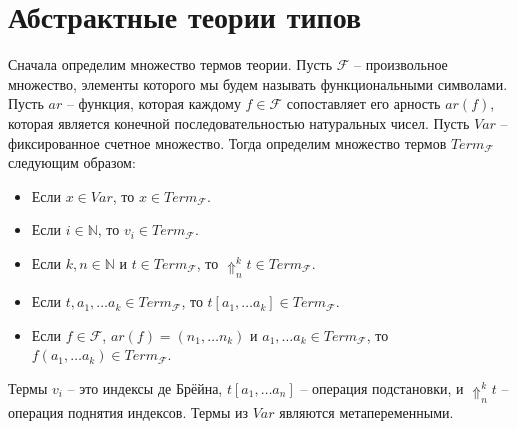 \documentclass{amsart}
\theoremstyle{definition}
\theoremstyle{remark}
\numberwithin{figure}{section}
\begin{document}
\begin{comment}
Пред-алгебра $D$ является алгеброй теории, если в ней выполнены все аксиомы из $\mathcal{I}$ и не существует сужения функций $f_D$ на подмножества их доменов такого, что все аксиомы при этом всё еще будут выполнены.
Смысл последнего условия заключается в том, что домены частичных функций $f_D$ должны быть не слишком велики и определяться множеством аксиом.
Заметим, что если в пред-алгебре $D$ выполнены аксиомы из $\mathcal{I}$, то существует уникальная алгебра $D' = (|D|, \{ R_D \}, \{ f_{D'} \})$, где $f_{D'}$ являются сужением $f_D$ на подмножества их доменов.

Нам осталось определить морфизмы алгебр.
Если $D$ -- алгебра теории $T$ и $S \in \mathcal{S}$, то мы будем обозначать $S(D)$ множество функций $t : ar(S) \to |D|$ таких, что верно $S(t)$.
Если $D$ и $D'$ - алгебры теории $T$, то морфизм $F : D \to D'$ состоит из коллекции функций $\{ F_S : S(D) \to S(D') \}_{S \in \mathcal{S}}$ такой,
что для любого $f \in \mathcal{F}$, любой $s : ar(f) \to \mathcal{S}$, любого $r \in \mathcal{S}$ и любой $t \in \Pi_{i \in ar(f)} (s(i)(D))$ верно,
что если $f_D(t)$ определено и $f_D(t) \in r(D)$, то $f_{D'}(i \mapsto F_{s(i)}(t(i)))$ определено и равно $F_r(f_D(t))$.

\subsection{Эквивалентность с классическим определением}
\end{comment}

\section{Абстрактные теории типов}

Сначала определим множество термов теории.
Пусть $\mathcal{F}$ -- произвольное множество, элементы которого мы будем называть функциональными символами.
Пусть $ar$ -- функция, которая каждому $f \in \mathcal{F}$ сопоставляет его арность $ar(f)$, которая является конечной последовательностью натуральных чисел.
Пусть $Var$ -- фиксированное счетное множество.
Тогда определим множество термов $Term_\mathcal{F}$ следующим образом:
\begin{itemize}
\item Если $x \in Var$, то $x \in Term_\mathcal{F}$.
\item Если $i \in \mathbb{N}$, то $v_i \in Term_\mathcal{F}$.
\item Если $k,n \in \mathbb{N}$ и $t \in Term_\mathcal{F}$, то $\Uparrow^k_n t \in Term_\mathcal{F}$.
\item Если $t, a_1, \ldots a_k \in Term_\mathcal{F}$, то $t[a_1, \ldots a_k] \in Term_\mathcal{F}$.
\item Если $f \in \mathcal{F}$, $ar(f) = (n_1, \ldots n_k)$ и $a_1, \ldots a_k \in Term_\mathcal{F}$, то $f(a_1, \ldots a_k) \in Term_\mathcal{F}$.
\end{itemize}
Термы $v_i$ -- это индексы де Брёйна, $t[a_1, \ldots a_n]$ -- операция подстановки, и $\Uparrow^k_n t$ -- операция поднятия индексов.
Термы из $Var$ являются метапеременными.
\end{document}
